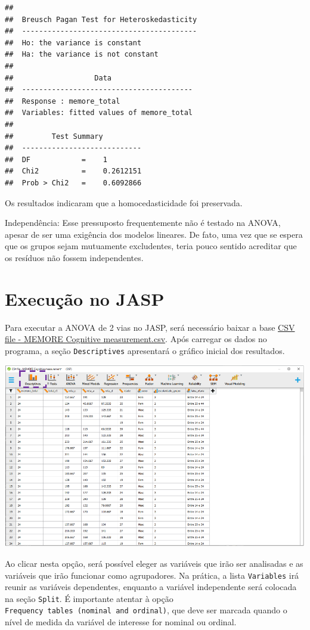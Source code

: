 \documentclass[
]{book}
\begin{document}
\begin{verbatim}
## 
##  Breusch Pagan Test for Heteroskedasticity
##  -----------------------------------------
##  Ho: the variance is constant            
##  Ha: the variance is not constant        
## 
##                   Data                   
##  ----------------------------------------
##  Response : memore_total 
##  Variables: fitted values of memore_total 
## 
##         Test Summary         
##  ----------------------------
##  DF            =    1 
##  Chi2          =    0.2612151 
##  Prob > Chi2   =    0.6092866
\end{verbatim}

Os resultados indicaram que a homocedasticidade foi preservada.

Independência: Esse pressuposto frequentemente não é testado na ANOVA, apesar de ser uma exigência dos modelos lineares. De fato, uma vez que se espera que os grupos sejam mutuamente excludentes, teria pouco sentido acreditar que os resíduos não fossem independentes.

\hypertarget{execuuxe7uxe3o-no-jasp-8}{%
\section{Execução no JASP}\label{execuuxe7uxe3o-no-jasp-8}}

Para executar a ANOVA de 2 vias no JASP, será necessário baixar a base \href{https://osf.io/4hdc2/}{CSV file - MEMORE Cognitive measurement.csv}. Após carregar os dados no programa, a seção \texttt{Descriptives} apresentará o gráfico inicial dos resultados.

\includegraphics{./img/cap_anova_two_way_descriptives.png}

Ao clicar nesta opção, será possível eleger as variáveis que irão ser analisadas e as variáveis que irão funcionar como agrupadores. Na prática, a lista \texttt{Variables} irá reunir as variáveis dependentes, enquanto a variável independente será colocada na seção \texttt{Split}. É importante atentar à opção \texttt{Frequency\ tables\ (nominal\ and\ ordinal)}, que deve ser marcada quando o nível de medida da variável de interesse for nominal ou ordinal.
\end{document}
